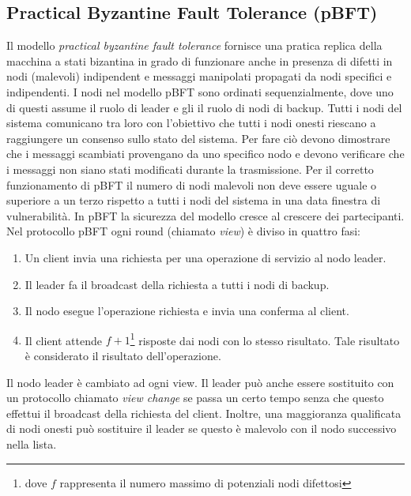\subsection{Practical Byzantine Fault Tolerance (pBFT)}
Il modello \textit{practical byzantine fault tolerance} fornisce una pratica replica della macchina a stati
bizantina in grado di funzionare anche in presenza di difetti
in nodi (malevoli) indipendent e messaggi manipolati propagati da nodi specifici e indipendenti.
I nodi nel modello pBFT sono ordinati sequenzialmente, dove uno di questi assume il ruolo di leader
e gli il ruolo di nodi di backup. Tutti i nodi del sistema comunicano tra loro
con l'obiettivo che tutti i nodi onesti riescano a raggiungere un consenso sullo stato del sistema.
Per fare ciò devono dimostrare che i messaggi scambiati provengano da uno specifico nodo e devono
verificare che i messaggi non siano stati modificati durante la trasmissione.
Per il corretto funzionamento di pBFT il numero di nodi malevoli non deve essere uguale o superiore
a un terzo rispetto a tutti i nodi del sistema in una data finestra di vulnerabilità.
In pBFT la sicurezza del modello cresce al crescere dei partecipanti.
Nel protocollo pBFT ogni round (chiamato \textit{view}) è diviso in quattro fasi:
\begin{enumerate}
	\item Un client invia una richiesta per una operazione di servizio al nodo leader.
	\item Il leader fa il broadcast della richiesta a tutti i nodi di backup.
	\item Il nodo esegue l'operazione richiesta e invia una conferma al client.
	\item Il client attende $ f + 1 $\footnote{dove $ f $ rappresenta
		      il numero massimo di potenziali nodi difettosi} risposte dai nodi con lo stesso risultato.
	      Tale risultato è considerato il risultato dell'operazione.
\end{enumerate}
Il nodo leader è cambiato ad ogni view. Il leader può anche essere sostituito con un protocollo chiamato
\textit{view change} se passa un certo tempo senza che questo effettui il broadcast
della richiesta del client. Inoltre, una maggioranza qualificata di nodi onesti può sostituire il leader
se questo è malevolo con il nodo successivo nella lista.

